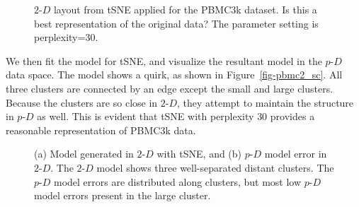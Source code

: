 \documentclass[
  12pt]{article}
\newcommand\pD{$p\text{-}D$}
\newcommand\gD{$2\text{-}D$}
\begin{document}
\begin{figure}[H]


\caption{\label{fig-tsne-suggest}\(2\text{-}D\) layout from tSNE applied
for the PBMC3k dataset. Is this a best representation of the original
data? The parameter setting is perplexity=30.}

\end{figure}%

We then fit the model for tSNE, and visualize the resultant model in the
\pD{} data space. The model shows a quirk, as shown in
Figure~\ref{fig-pbmc2_sc}. All three clusters are connected by an edge
except the small and large clusters. Because the clusters are so close
in \gD{}, they attempt to maintain the structure in \pD{} as well. This
is evident that tSNE with perplexity \(30\) provides a reasonable
representation of PBMC3k data.

\begin{figure}[H]


\caption{\label{fig-model-pbmc}(a) Model generated in \(2\text{-}D\)
with tSNE, and (b) \(p\text{-}D\) model error in \(2\text{-}D\). The
\(2\text{-}D\) model shows three well-separated distant clusters. The
\(p\text{-}D\) model errors are distributed along clusters, but most low
\(p\text{-}D\) model errors present in the large cluster.}

\end{figure}%
\end{document}
